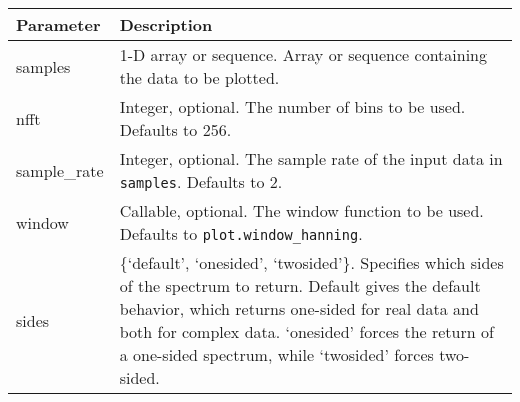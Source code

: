 \documentclass[]{article}
\begin{document}
\begin{longtable}[]{@{}ll@{}}
\toprule
\begin{minipage}[b]{0.15\columnwidth}\raggedright\strut
Parameter\strut
\end{minipage} & \begin{minipage}[b]{0.80\columnwidth}\raggedright\strut
Description\strut
\end{minipage}\tabularnewline
\midrule
\endhead
\begin{minipage}[t]{0.15\columnwidth}\raggedright\strut
samples\strut
\end{minipage} & \begin{minipage}[t]{0.80\columnwidth}\raggedright\strut
1-D array or sequence. Array or sequence containing the data to be
plotted.\strut
\end{minipage}\tabularnewline
\begin{minipage}[t]{0.15\columnwidth}\raggedright\strut
nfft\strut
\end{minipage} & \begin{minipage}[t]{0.80\columnwidth}\raggedright\strut
Integer, optional. The number of bins to be used. Defaults to 256.\strut
\end{minipage}\tabularnewline
\begin{minipage}[t]{0.15\columnwidth}\raggedright\strut
sample\_rate\strut
\end{minipage} & \begin{minipage}[t]{0.80\columnwidth}\raggedright\strut
Integer, optional. The sample rate of the input data in
\texttt{samples}. Defaults to 2.\strut
\end{minipage}\tabularnewline
\begin{minipage}[t]{0.15\columnwidth}\raggedright\strut
window\strut
\end{minipage} & \begin{minipage}[t]{0.80\columnwidth}\raggedright\strut
Callable, optional. The window function to be used. Defaults to
\texttt{plot.window\_hanning}.\strut
\end{minipage}\tabularnewline
\begin{minipage}[t]{0.15\columnwidth}\raggedright\strut
sides\strut
\end{minipage} & \begin{minipage}[t]{0.80\columnwidth}\raggedright\strut
\{`default', `onesided', `twosided'\}. Specifies which sides of the
spectrum to return. Default gives the default behavior, which returns
one-sided for real data and both for complex data. `onesided' forces the
return of a one-sided spectrum, while `twosided' forces two-sided.\strut
\end{minipage}\tabularnewline
\bottomrule
\end{longtable}
\end{document}
